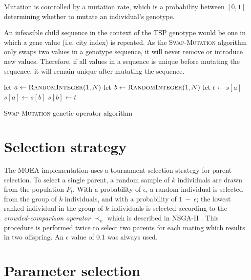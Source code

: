 \documentclass[paper=a4, fontsize=10pt]{scrartcl}
\begin{document}
Mutation is controlled by a mutation rate, which is a probability between $[0, 1]$ determining whether to mutate an individual's genotype.

An infeasible child sequence in the context of the \ac{TSP} genotype would be one in which a gene value (i.e. city index) is repeated. As the \textsc{Swap-Mutation} algorithm only swaps two values in a genotype sequence, it will never remove or introduce new values. Therefore, if all values in a sequence is unique before mutating the sequence, it will remain unique after mutating the sequence.

\begin{algorithm}
\small
\begin{algorithmic}[1]
    \State let $a \gets \textsc{RandomInteger}(1, N)$
    \State let $b \gets \textsc{RandomInteger}(1, N)$
    \State let $\textit{t} \gets s[a]$
    \State $s[a] \gets s[b]$
    \State $s[b] \gets \textit{t}$
\EndFunction
\end{algorithmic}
\caption{\textsc{Swap-Mutation} genetic operator algorithm}
\label{alg:swap}
\end{algorithm}

\section*{Selection strategy}

The \ac{MOEA} implementation uses a tournament selection strategy for parent selection. To select a single parent, a random sample of $k$ individuals are drawn from the population $P_t$. With a probability of $\epsilon$, a random individual is selected from the group of $k$ individuals, and with a probability of $1~-~\epsilon$; the lowest ranked individual in the group of $k$ individuals is selected according to the \textit{crowded-comparison operator} $\prec_n$ which is described in NSGA-II \cite{deb2002fast}. This procedure is performed twice to select two parents for each mating which results in two offspring. An $\epsilon$ value of 0.1 was always used.

\section*{Parameter selection}
\end{document}
